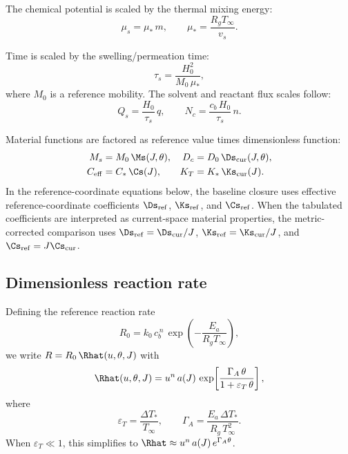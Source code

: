 The chemical potential is scaled by the thermal mixing energy:
\begin{equation}
  \mu_s = \mu_*\,m, \qquad \mu_* = \frac{R_g T_\infty}{v_s}.
\end{equation}

Time is scaled by the swelling/permeation time:
\begin{equation}
  \tau_s = \frac{H_0^2}{M_0\,\mu_*},
\end{equation}
where $M_0$ is a reference mobility. The solvent and reactant flux scales follow:
\begin{equation}
  Q_s = \frac{H_0}{\tau_s}\,q,
  \qquad
  N_c = \frac{c_b\,H_0}{\tau_s}\,n.
\end{equation}

Material functions are factored as reference value times dimensionless function:
\begin{align}
  M_s &= M_0\,\Ms(J,\theta), &
  D_c &= D_0\,\Ds_\mathrm{cur}(J,\theta), \\
  C_\mathrm{eff} &= C_*\,\Cs(J), &
  K_T &= K_*\,\Ks_\mathrm{cur}(J).
\end{align}
In the reference-coordinate equations below, the baseline closure
uses effective reference-coordinate coefficients
$\Ds_\mathrm{ref}$, $\Ks_\mathrm{ref}$, and $\Cs_\mathrm{ref}$.
When the tabulated coefficients are interpreted as current-space
material properties, the metric-corrected comparison uses
$\Ds_\mathrm{ref}=\Ds_\mathrm{cur}/J$,
$\Ks_\mathrm{ref}=\Ks_\mathrm{cur}/J$, and
$\Cs_\mathrm{ref}=J\Cs_\mathrm{cur}$.

\subsection{Dimensionless reaction rate}

Defining the reference reaction rate
\begin{equation}
  R_0 = k_0\,c_b^{\,n}\,\exp\!\left(-\frac{E_a}{R_g T_\infty}\right),
\end{equation}
we write $R = R_0\,\Rhat(u,\theta,J)$ with
\begin{equation}
  \Rhat(u,\theta,J)
  = u^n\,a(J)\,
  \exp\!\left[\frac{\Gamma_A\,\theta}{1+\varepsilon_T\,\theta}\right],
  \label{eq:Rhat}
\end{equation}
where
\begin{equation}
  \varepsilon_T = \frac{\Delta T_*}{T_\infty},
  \qquad
  \Gamma_A = \frac{E_a\,\Delta T_*}{R_g\,T_\infty^2}.
  \label{eq:epsT_GammaA}
\end{equation}
When $\varepsilon_T \ll 1$, this simplifies to $\Rhat \approx u^n\,a(J)\,e^{\Gamma_A\theta}$.

